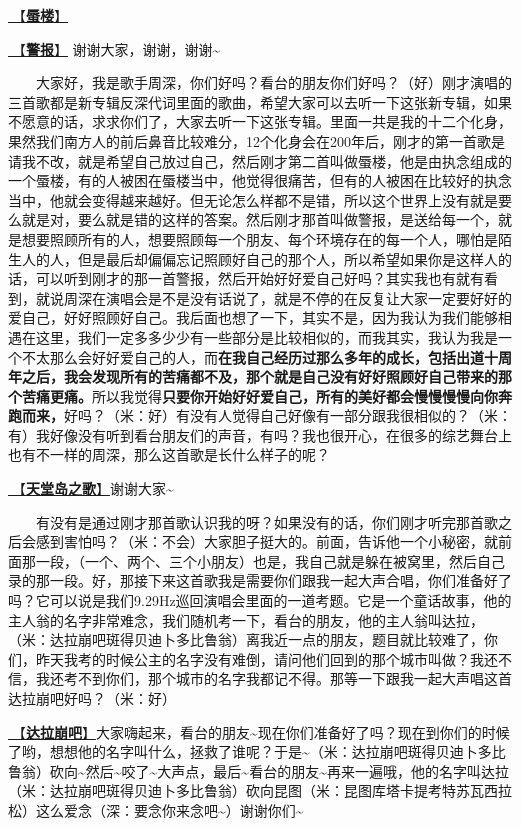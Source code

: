 \documentclass[]{ctexbook}
\begin{document}
\hyperref[mirage]{🎵【\textbf{蜃楼}】}

\hyperref[the-giver]{🎵【\textbf{警报}】} 谢谢大家，谢谢，谢谢\textasciitilde{}

  大家好，我是歌手周深，你们好吗？看台的朋友你们好吗？（好）刚才演唱的三首歌都是新专辑反深代词里面的歌曲，希望大家可以去听一下这张新专辑，如果不愿意的话，求求你们了，大家去听一下这张专辑。里面一共是我的十二个化身，果然我们南方人的前后鼻音比较难分，12个化身会在200年后，刚才的第一首歌是请我不改，就是希望自己放过自己，然后刚才第二首叫做蜃楼，他是由执念组成的一个蜃楼，有的人被困在蜃楼当中，他觉得很痛苦，但有的人被困在比较好的执念当中，他就会变得越来越好。但无论怎么样都不是错，所以这个世界上没有就是要么就是对，要么就是错的这样的答案。然后刚才那首叫做警报，是送给每一个，就是想要照顾所有的人，想要照顾每一个朋友、每个环境存在的每一个人，哪怕是陌生人的人，但是最后却偏偏忘记照顾好自己的那个人，所以希望如果你是这样人的话，可以听到刚才的那一首警报，然后开始好好爱自己好吗？其实我也有就有看到，就说周深在演唱会是不是没有话说了，就是不停的在反复让大家一定要好好的爱自己，好好照顾好自己。我后面也想了一下，其实不是，因为我认为我们能够相遇在这里，我们一定多多少少有一些部分是比较相似的，而我其实，我认为我是一个不太那么会好好爱自己的人，而\textbf{在我自己经历过那么多年的成长，包括出道十周年之后，我会发现所有的苦痛都不及，那个就是自己没有好好照顾好自己带来的那个苦痛更痛。}所以我觉得\textbf{只要你开始好好爱自己，所有的美好都会慢慢慢慢向你奔跑而来，}好吗？（米：好）有没有人觉得自己好像有一部分跟我很相似的？（米：有）我好像没有听到看台朋友们的声音，有吗？我也很开心，在很多的综艺舞台上也有不一样的周深，那么这首歌是长什么样子的呢？

\hyperref[haven-song]{🎵【\textbf{天堂岛之歌}】}谢谢大家\textasciitilde{}

  有没有是通过刚才那首歌认识我的呀？如果没有的话，你们刚才听完那首歌之后会感到害怕吗？（米：不会）大家胆子挺大的。前面，告诉他一个小秘密，就前面那一段，（一个、两个、三个小朋友）也是，我自己就是躲在被窝里，然后自己录的那一段。好，那接下来这首歌我是需要你们跟我一起大声合唱，你们准备好了吗？它可以说是我们9.29Hz巡回演唱会里面的一道考题。它是一个童话故事，他的主人翁的名字非常难念，我们随机考一下，看台的朋友，他的主人翁叫达拉，（米：达拉崩吧斑得贝迪卜多比鲁翁）离我近一点的朋友，题目就比较难了，你们，昨天我考的时候公主的名字没有难倒，请问他们回到的那个城市叫做？我还不信，我还考不到你们，那个城市的名字我都记不得。那等一下跟我一起大声唱这首达拉崩吧好吗？（米：好）

\hyperref[dalabengba]{🎵【\textbf{达拉崩吧}】}大家嗨起来，看台的朋友\textasciitilde 现在你们准备好了吗？现在到你们的时候了哟，想想他的名字叫什么，拯救了谁呢？于是\textasciitilde（米：达拉崩吧斑得贝迪卜多比鲁翁）砍向\textasciitilde 然后\textasciitilde 咬了\textasciitilde 大声点，最后\textasciitilde 看台的朋友\textasciitilde 再来一遍哦，他的名字叫达拉（米：达拉崩吧斑得贝迪卜多比鲁翁）砍向昆图（米：昆图库塔卡提考特苏瓦西拉松）这么爱念（深：要念你来念吧\textasciitilde）谢谢你们\textasciitilde{}
\end{document}
